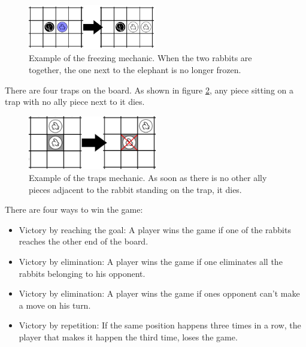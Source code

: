 \begin{figure}[!h]
\centering
\includegraphics[width=0.5\textwidth]{1_Presentation/1.1_Arimaa_rules_Gabriel/Pictures/Freeze.png}
\caption[Example of the freezing mechanic.]{Example of the freezing mechanic. When the two rabbits are together, the one next to the elephant is no longer frozen.}
\label{fig:freeze}
\end{figure}

There are four traps on the board. As shown in figure \ref{fig:trap}, any piece sitting on a trap with no ally piece next to it dies.

\begin{figure}[!h]
\centering
\includegraphics[width=0.5\textwidth]{1_Presentation/1.1_Arimaa_rules_Gabriel/Pictures/Trap.png}
\caption[Example of the traps mechanic.]{Example of the traps mechanic. As soon as there is no other ally pieces adjacent to the rabbit standing on the trap, it dies.}
\label{fig:trap}
\end{figure}

There are four ways to win the game:

\begin{itemize}
\item Victory by reaching the goal: A player wins the game if one of the rabbits reaches the other end of the board.
\item Victory by elimination: A player wins the game if one eliminates all the rabbits belonging to his opponent.
\item Victory by elimination: A player wins the game if ones opponent can't make a move on his turn.
\item Victory by repetition: If the same position happens three times in a row, the player that makes it happen the third time, loses the game.
\end{itemize}
